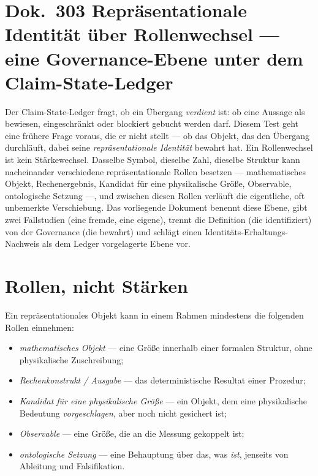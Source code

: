 
\section*{Dok.~303 \quad Repräsentationale Identität über Rollenwechsel ---
eine Governance-Ebene unter dem Claim-State-Ledger}

Der Claim-State-Ledger fragt, ob ein Übergang \emph{verdient} ist: ob eine Aussage als
bewiesen, eingeschränkt oder blockiert gebucht werden darf. Diesem Test geht eine
frühere Frage voraus, die er nicht stellt --- ob das Objekt, das den Übergang durchläuft,
dabei seine \emph{repräsentationale Identität} bewahrt hat. Ein Rollenwechsel ist kein
Stärkewechsel. Dasselbe Symbol, dieselbe Zahl, dieselbe Struktur kann nacheinander
verschiedene repräsentationale Rollen besetzen --- mathematisches Objekt, Rechenergebnis,
Kandidat für eine physikalische Größe, Observable, ontologische Setzung ---, und zwischen
diesen Rollen verläuft die eigentliche, oft unbemerkte Verschiebung. Das vorliegende
Dokument benennt diese Ebene, gibt zwei Fallstudien (eine fremde, eine eigene), trennt die
Definition (die identifiziert) von der Governance (die bewahrt) und schlägt einen
Identitäts-Erhaltungs-Nachweis als dem Ledger vorgelagerte Ebene vor.

\section{Rollen, nicht Stärken}

Ein repräsentationales Objekt kann in einem Rahmen mindestens die folgenden Rollen
einnehmen:

\begin{itemize}
\item \emph{mathematisches Objekt} --- eine Größe innerhalb einer formalen Struktur, ohne
physikalische Zuschreibung;
\item \emph{Rechenkonstrukt / Ausgabe} --- das deterministische Resultat einer Prozedur;
\item \emph{Kandidat für eine physikalische Größe} --- ein Objekt, dem eine physikalische
Bedeutung \emph{vorgeschlagen}, aber noch nicht gesichert ist;
\item \emph{Observable} --- eine Größe, die an die Messung gekoppelt ist;
\item \emph{ontologische Setzung} --- eine Behauptung über das, was \emph{ist}, jenseits
von Ableitung und Falsifikation.
\end{itemize}


